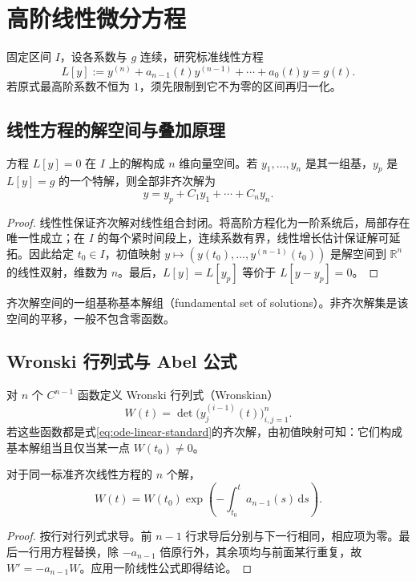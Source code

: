 \setcounter{chapter}{5} %
\chapter{高阶线性微分方程}
\label{chap:ode-linear-scalar}

固定区间 $I$，设各系数与 $g$ 连续，研究标准线性方程
\begin{equation}
 L[y]:=y^{(n)}+a_{n-1}(t)y^{(n-1)}+\cdots+a_0(t)y=g(t).
 \label{eq:ode-linear-standard}
\end{equation}
若原式最高阶系数不恒为 $1$，须先限制到它不为零的区间再归一化。

\section{线性方程的解空间与叠加原理}
\begin{theorem}
方程 $L[y]=0$ 在 $I$ 上的解构成 $n$ 维向量空间。若 $y_1,\ldots,y_n$ 是其一组基，$y_p$ 是 $L[y]=g$ 的一个特解，则全部非齐次解为
\[
 y=y_p+C_1y_1+\cdots+C_ny_n.
\]
\end{theorem}
\begin{proof}
线性性保证齐次解对线性组合封闭。将高阶方程化为一阶系统后，局部存在唯一性成立；在 $I$ 的每个紧时间段上，连续系数有界，线性增长估计保证解可延拓。因此给定 $t_0\in I$，初值映射 $y\mapsto(y(t_0),\ldots,y^{(n-1)}(t_0))$ 是解空间到 $\mathbb R^n$ 的线性双射，维数为 $n$。最后，$L[y]=L[y_p]$ 等价于 $L[y-y_p]=0$。
\end{proof}

齐次解空间的一组基称基本解组（fundamental set of solutions）。非齐次解集是该空间的平移，一般不包含零函数。

\section{Wronski 行列式与 Abel 公式}
对 $n$ 个 $C^{n-1}$ 函数定义 Wronski 行列式（Wronskian）
\[
 W(t)=\det\bigl(y_j^{(i-1)}(t)\bigr)_{i,j=1}^n.
\]
若这些函数都是式\eqref{eq:ode-linear-standard}的齐次解，由初值映射可知：它们构成基本解组当且仅当某一点 $W(t_0)\ne0$。

\begin{proposition}[Abel 公式]
对于同一标准齐次线性方程的 $n$ 个解，
\begin{equation}
 W(t)=W(t_0)\exp\!\left(-\int_{t_0}^t a_{n-1}(s)\,\mathrm ds\right).
 \label{eq:ode-abel}
\end{equation}
\end{proposition}
\begin{proof}
按行对行列式求导。前 $n-1$ 行求导后分别与下一行相同，相应项为零。最后一行用方程替换，除 $-a_{n-1}$ 倍原行外，其余项均与前面某行重复，故 $W'=-a_{n-1}W$。应用一阶线性公式即得结论。
\end{proof}

